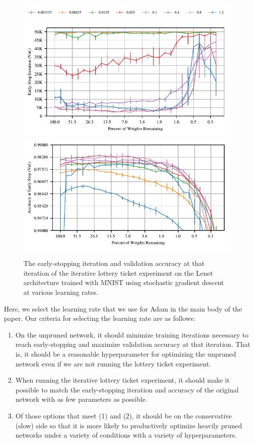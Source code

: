\begin{figure}
\centering
\includegraphics[width=.7\textwidth]{graphs/mnist/lenet/sgd_rate_sweep/legend}
\includegraphics[width=.5\textwidth]{graphs/mnist/lenet/sgd_rate_sweep/iteration}%
\includegraphics[width=.5\textwidth]{graphs/mnist/lenet/sgd_rate_sweep/accuracy}
\caption{The early-stopping iteration and validation accuracy at that iteration of the iterative lottery ticket experiment on the Lenet architecture trained with MNIST using
stochastic gradient descent at various learning rates.}
\label{fig:appendix-sgd}
\end{figure}

Here, we select the learning rate that we use for Adam in the main body of the paper. 
Our criteria for selecting the learning rate are as follows:
\begin{enumerate}
\item On the unpruned network, it should minimize training iterations necessary to reach early-stopping and maximize validation accuracy at that iteration. That is,
   it should be a reasonable hyperparameter for optimizing the unpruned network even if we are not running the lottery ticket experiment.
\item When running the iterative lottery ticket experiment, it should make it possible to match the early-stopping iteration and accuracy of the original
           network with as few parameters as possible.
\item Of those options that meet (1) and (2), it should be on the conservative (slow) side so that it is more likely to productively optimize heavily pruned networks
           under a variety of conditions with a variety of hyperparameters.
\end{enumerate}

